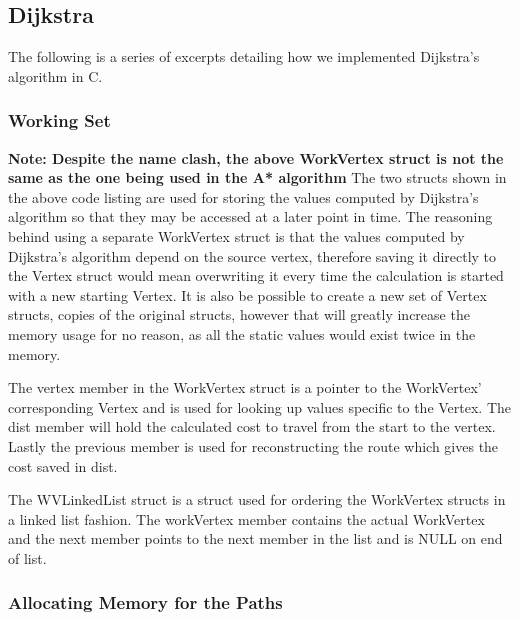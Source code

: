 \subsection{Dijkstra}

The following is a series of excerpts detailing how we implemented Dijkstra's algorithm in C.

\subsubsection{Working Set}



\textbf{Note: Despite the name clash, the above WorkVertex struct is not the same as the one being used in the A* algorithm}
The two structs shown in the above code listing are used for storing the values computed by Dijkstra's algorithm so that they may be accessed at a later point in time. The reasoning behind using a separate WorkVertex struct is that the values computed by Dijkstra's algorithm depend on the source vertex, therefore saving it directly to the Vertex struct would mean overwriting it every time the calculation is started with a new starting Vertex. It is also be possible to create a new set of Vertex structs, copies of the original structs, however that will greatly increase the memory usage for no reason, as all the static values would exist twice in the memory.

The vertex member in the WorkVertex struct is a pointer to the WorkVertex' corresponding Vertex and is used for looking up values specific to the Vertex. The dist member will hold the calculated cost to travel from the start to the vertex. Lastly the previous member is used for reconstructing the route which gives the cost saved in dist.

The WVLinkedList struct is a struct used for ordering the WorkVertex structs in a linked list fashion. The workVertex member contains the actual WorkVertex and the next member points to the next member in the list and is NULL on end of list.

\subsubsection{Allocating Memory for the Paths}



